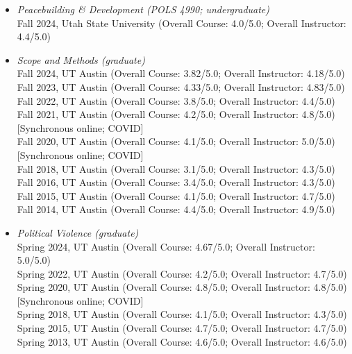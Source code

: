 \documentclass[10pt]{article}
\begin{document}
\begin{itemize}
\item \textit{Peacebuilding \& Development (POLS 4990; undergraduate)}
\\ \indent Fall 2024, Utah State University (Overall Course: 4.0/5.0; Overall Instructor: 4.4/5.0)


\item \textit{Scope and Methods (graduate)}
\\ \indent Fall 2024, UT Austin (Overall Course: 3.82/5.0; Overall Instructor: 4.18/5.0)
\\ \indent Fall 2023, UT Austin (Overall Course: 4.33/5.0; Overall Instructor: 4.83/5.0)
\\ \indent Fall 2022, UT Austin (Overall Course: 3.8/5.0; Overall Instructor: 4.4/5.0)
\\ \indent Fall 2021, UT Austin (Overall Course: 4.2/5.0; Overall Instructor: 4.8/5.0) [Synchronous online; COVID]
\\ \indent Fall 2020, UT Austin (Overall Course: 4.1/5.0; Overall Instructor: 5.0/5.0) [Synchronous online; COVID]
\\ \indent Fall 2018, UT Austin (Overall Course: 3.1/5.0; Overall Instructor: 4.3/5.0)
\\ \indent Fall 2016, UT Austin (Overall Course: 3.4/5.0; Overall Instructor: 4.3/5.0)
\\ \indent Fall 2015, UT Austin (Overall Course: 4.1/5.0; Overall Instructor: 4.7/5.0)
\\ \indent Fall 2014, UT Austin (Overall Course: 4.4/5.0; Overall Instructor: 4.9/5.0)

\item \textit{Political Violence (graduate)}
\\ \indent Spring 2024, UT Austin (Overall Course: 4.67/5.0; Overall Instructor: 5.0/5.0)
\\ \indent Spring 2022, UT Austin (Overall Course: 4.2/5.0; Overall Instructor: 4.7/5.0)
\\ \indent Spring 2020, UT Austin (Overall Course: 4.8/5.0; Overall Instructor: 4.8/5.0) [Synchronous online; COVID]
\\ \indent Spring 2018, UT Austin (Overall Course: 4.1/5.0; Overall Instructor: 4.3/5.0)
\\ \indent Spring 2015, UT Austin (Overall Course: 4.7/5.0; Overall Instructor: 4.7/5.0)
\\ \indent Spring 2013, UT Austin (Overall Course: 4.6/5.0; Overall Instructor: 4.6/5.0)


\end{itemize}
\end{document}
